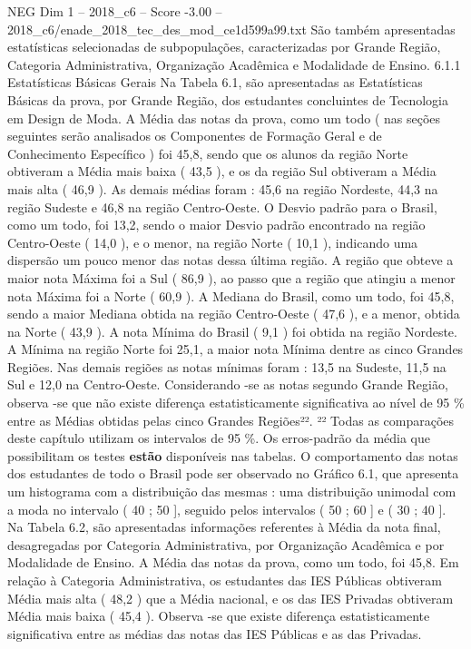 \begin{textsample}{NEG Dim 1 – 2018\_c6 – Score -3.00 – 2018\_c6/enade\_2018\_tec\_des\_mod\_ce1d599a99.txt}
São também apresentadas estatísticas selecionadas de subpopulações, caracterizadas por Grande Região, Categoria Administrativa, Organização Acadêmica e Modalidade de Ensino. 6.1.1 Estatísticas Básicas Gerais Na Tabela 6.1, são apresentadas as Estatísticas Básicas da prova, por Grande Região, dos estudantes concluintes de Tecnologia em Design de Moda.
A Média das notas da prova, como um todo ( nas seções seguintes serão analisados os Componentes de Formação Geral e de Conhecimento Específico ) foi 45,8, sendo que os alunos da região Norte obtiveram a Média mais baixa ( 43,5 ), e os da região Sul obtiveram a Média mais alta ( 46,9 ).
As demais médias foram : 45,6 na região Nordeste, 44,3 na região Sudeste e 46,8 na região Centro-Oeste.
O Desvio padrão para o Brasil, como um todo, foi 13,2, sendo o maior Desvio padrão encontrado na região Centro-Oeste ( 14,0 ), e o menor, na região Norte ( 10,1 ), indicando uma dispersão um pouco menor das notas dessa última região.
A região que obteve a maior nota Máxima foi a Sul ( 86,9 ), ao passo que a região que atingiu a menor nota Máxima foi a Norte ( 60,9 ).
A Mediana do Brasil, como um todo, foi 45,8, sendo a maior Mediana obtida na região Centro-Oeste ( 47,6 ), e a menor, obtida na Norte ( 43,9 ).
A nota Mínima do Brasil ( 9,1 ) foi obtida na região Nordeste.
A Mínima na região Norte foi 25,1, a maior nota Mínima dentre as cinco Grandes Regiões.
Nas demais regiões as notas mínimas foram : 13,5 na Sudeste, 11,5 na Sul e 12,0 na Centro-Oeste.
Considerando -se as notas segundo Grande Região, observa -se que não existe diferença estatisticamente significativa ao nível de 95 \% entre as Médias obtidas pelas cinco Grandes Regiões²². ²² Todas as comparações deste capítulo utilizam os intervalos de 95 \%.
Os erros-padrão da média que possibilitam os testes \textbf{estão} disponíveis nas tabelas.
O comportamento das notas dos estudantes de todo o Brasil pode ser observado no Gráfico 6.1, que apresenta um histograma com a distribuição das mesmas : uma distribuição unimodal com a moda no intervalo ( 40 ; 50 ], seguido pelos intervalos ( 50 ; 60 ] e ( 30 ; 40 ].
Na Tabela 6.2, são apresentadas informações referentes à Média da nota final, desagregadas por Categoria Administrativa, por Organização Acadêmica e por Modalidade de Ensino.
A Média das notas da prova, como um todo, foi 45,8.
Em relação à Categoria Administrativa, os estudantes das IES Públicas obtiveram Média mais alta ( 48,2 ) que a Média nacional, e os das IES Privadas obtiveram Média mais baixa ( 45,4 ).
Observa -se que existe diferença estatisticamente significativa entre as médias das notas das IES Públicas e as das Privadas.

\end{textsample}
